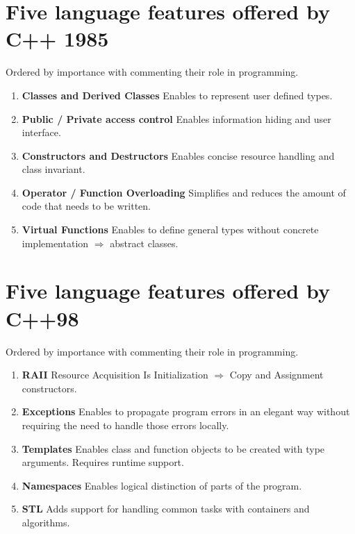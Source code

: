 \documentclass{article}
\begin{document}
 \section*{Five language features offered by C++ 1985}
 Ordered by importance with commenting their role in programming.
 \begin{enumerate}
  \item \textbf{Classes and Derived Classes} \- Enables to represent user defined types.
  \item \textbf{Public / Private access control} \- Enables information hiding and user interface.
  \item \textbf{Constructors and Destructors} \- Enables concise resource handling and class invariant.
  \item \textbf{Operator / Function Overloading} \- Simplifies and reduces the amount of code that needs to be written.
  \item \textbf{Virtual Functions} \- Enables to define general types without concrete implementation $\Rightarrow$ abstract classes.
 \end{enumerate}
 
 \section*{Five language features offered by C++98}
 Ordered by importance with commenting their role in programming.
 \begin{enumerate}
  \item \textbf{RAII} \- Resource Acquisition Is Initialization $\Rightarrow$ Copy and Assignment constructors.
  \item \textbf{Exceptions} \- Enables to propagate program errors in an elegant way without requiring the need to handle those errors locally.
  \item \textbf{Templates} \- Enables class and function objects to be created with type arguments. Requires runtime support.
  \item \textbf{Namespaces} \- Enables logical distinction of parts of the program.
  \item \textbf{STL} \- Adds support for handling common tasks with containers and algorithms.
 \end{enumerate}
 
\end{document}
